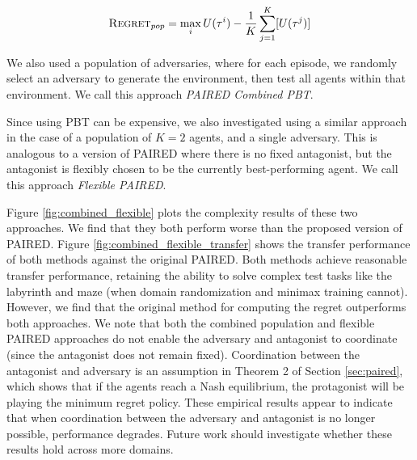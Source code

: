 \documentclass{article}
\begin{document}
\begin{appendix}
\begin{align}
    \textsc{Regret}_{pop} = \max_{i} U(\tau^i) - \frac{1}{K} \sum_{j=1}^K [U(\tau^j)]
\end{align}

We also used a population of adversaries, where for each episode, we randomly select an adversary to generate the environment, then test all agents within that environment. We call this approach \textit{PAIRED Combined PBT}.

Since using PBT can be expensive, we also investigated using a similar approach in the case of a population of $K=2$ agents, and a single adversary. This is analogous to a version of PAIRED where there is no fixed antagonist, but the antagonist is flexibly chosen to be the currently best-performing agent. We call this approach \textit{Flexible PAIRED}. 

Figure \ref{fig:combined_flexible} plots the complexity results of these two approaches. We find that they both perform worse than the proposed version of PAIRED. Figure \ref{fig:combined_flexible_transfer} shows the transfer performance of both methods against the original PAIRED. Both methods achieve reasonable transfer performance, retaining the ability to solve complex test tasks like the labyrinth and maze (when domain randomization and minimax training cannot). However, we find that the original method for computing the regret outperforms both approaches. We note that both the combined population and flexible PAIRED approaches do not enable the adversary and antagonist to coordinate (since the antagonist does not remain fixed). Coordination between the antagonist and adversary is an assumption in Theorem 2 of Section \ref{sec:paired}, which shows that if the agents reach a Nash equilibrium, the protagonist will be playing the minimum regret policy. These empirical results appear to indicate that when coordination between the adversary and antagonist is no longer possible, performance degrades. Future work should investigate whether these results hold across more domains.


\end{appendix}
\end{document}
